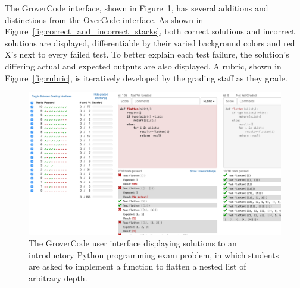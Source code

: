 The GroverCode interface, shown in Figure~\ref{fig:whole_interface}, has several additions and distinctions from the OverCode interface. As shown in Figure~\ref{fig:correct_and_incorrect_stacks}, both correct solutions and incorrect solutions are displayed, differentiable by their varied background colors and red X's next to every failed test. To better explain each test failure, the solution's differing actual and expected outputs are also displayed. A rubric, shown in Figure~\ref{fig:rubric}, is iteratively developed by the grading staff as they grade.

\begin{figure}
\centering
\includegraphics[width=\textwidth]{Body/figures/grovercode/figure_1}
\caption{The GroverCode user interface displaying solutions to an introductory Python programming exam problem, in which students are asked to implement a function to flatten a nested list of arbitrary depth.
}
\label{fig:whole_interface}
\end{figure} 

